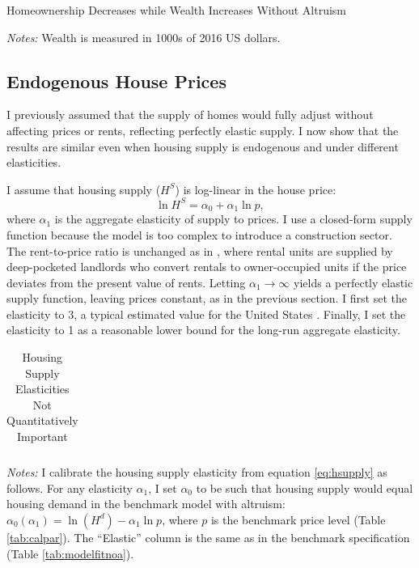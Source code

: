 \documentclass[12pt]{article}
\begin{document}
\begin{table}
	\center 
	\begin{threeparttable}
		\caption{Homeownership Decreases while Wealth Increases Without Altruism}\label{tab:modelfitnoa}
		
		\footnotesize
		\textit{Notes:} Wealth is measured in 1000s of 2016 US dollars.
	\end{threeparttable}
\end{table}

\subsection{Endogenous House Prices}\label{sec:endoprice}
I previously assumed that the supply of homes would fully adjust without affecting prices or rents, reflecting perfectly elastic supply. I now show that the results are similar even when housing supply is endogenous and under different elasticities.

I assume that housing supply ($H^S$) is log-linear in the house price:
\begin{equation}
\label{eq:hsupply}
\ln H^S = \alpha_0 + \alpha_1 \ln p,
\end{equation}
where $\alpha_1$ is the aggregate elasticity of supply to prices. I use a closed-form supply function because the model is too complex to introduce a construction sector. The rent-to-price ratio is unchanged as in \cite{Kaplan2020}, where rental units are supplied by deep-pocketed landlords who convert rentals to owner-occupied units if the price deviates from the present value of rents. Letting $\alpha_1\to\infty$ yields a perfectly elastic supply function, leaving prices constant, as in the previous section. I first set the elasticity to 3, a typical estimated value for the United States \cite[see e.g.,][]{saiz2010geographic,aastveit2023changing}. Finally, I set the elasticity to 1 as a reasonable lower bound for the long-run aggregate elasticity.

\begin{table}
	\center 
	\begin{threeparttable}
		\caption{Housing Supply Elasticities Not Quantitatively Important}\label{tab:quant_endogenprices}
		
		\begin{tabular}{@{}llll@{}}
			
		\end{tabular}
		
		\footnotesize
				\textit{Notes:} I calibrate the housing supply elasticity from equation \eqref{eq:hsupply} as follows. For any elasticity $\alpha_1$, I set $\alpha_0$ to be such that housing supply would equal housing demand in the benchmark model with altruism: $\alpha_0(\alpha_1) = \ln(H^d) - \alpha_1 \ln p$, where $p$ is the benchmark price level (Table \ref{tab:calpar}). The ``Elastic'' column is the same as in the benchmark specification (Table \ref{tab:modelfitnoa}).
	\end{threeparttable}
\end{table}
\end{document}
